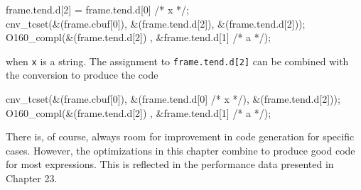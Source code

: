 \goodbreak
\begin{iconcode}
\>\>frame.tend.d[2] = frame.tend.d[0] /* x */;\\
\>\>cnv\_tcset(\&(frame.cbuf[0]), \&(frame.tend.d[2]), \&(frame.tend.d[2]));\\
\>\>O160\_compl(\&(frame.tend.d[2]) , \&frame.tend.d[1] /* a */);\\
\end{iconcode}

\noindent when \texttt{x} is a string. The assignment to
\texttt{frame.tend.d[2]} can be combined with the conversion to
produce the code

\goodbreak
\begin{iconcode}
\>\>cnv\_tcset(\&(frame.cbuf[0]), \&(frame.tend.d[0] /* x */), \&(frame.tend.d[2]));\\
\>\>O160\_compl(\&(frame.tend.d[2]) , \&frame.tend.d[1] /* a */);\\
\end{iconcode}

There is, of course, always room for improvement in code generation
for specific cases. However, the optimizations in this chapter combine
to produce good code for most expressions. This is reflected in the
performance data presented in Chapter 23.

